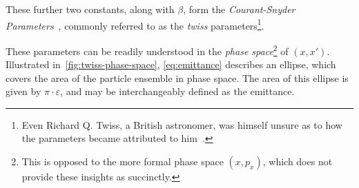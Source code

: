 \documentclass[11pt]{report}
\begin{document}
These further two constants, along with $\beta$, form the \textit{Courant-Snyder Parameters}~\cite{courantsnyder}, commonly referred to as the \textit{twiss} parameters\footnote{Even Richard Q. Twiss, a British astronomer, was himself unsure as to how the parameters became attributed to him~\cite{richardtwiss}.}. 

These parameters can be readily understood in the \textit{phase space}\footnote{This is opposed to the more formal phase space $(x, p_x)$, which does not provide these insights as succinctly.} of $(x, x')$. Illustrated in~\autoref{fig:twiss-phase-space}, \autoref{eq:emittance} describes an ellipse, which covers the area of the particle ensemble in phase space. The area of this ellipse is given by $\pi\cdot\varepsilon$, and may be interchangeably defined as the emittance. 
\end{document}
